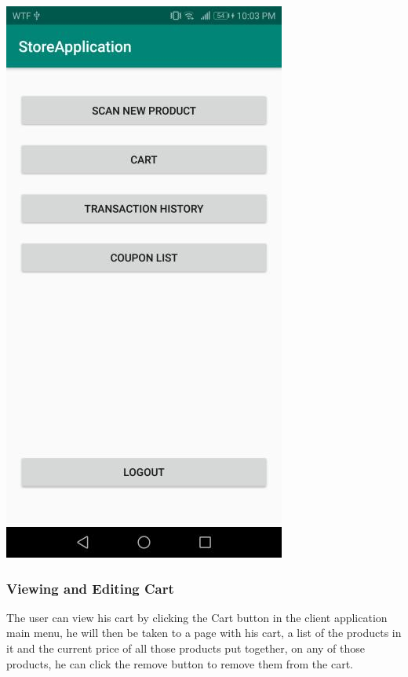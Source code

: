 \documentclass[12pt]{article}
\begin{document}
\begin{center}
\includegraphics[width=0.3\linewidth]{Images/Client/ClientMainMenu.jpg}
\end{center}

\subsubsection{Viewing and Editing Cart}
\hspace{0.6cm}
The user can view his cart by clicking the Cart button in the client application main menu, he will then be taken to a page with
his cart, a list of the products in it and the current price of all those products put together, on any of those products, he can click
the remove button to remove them from the cart.
\end{document}

